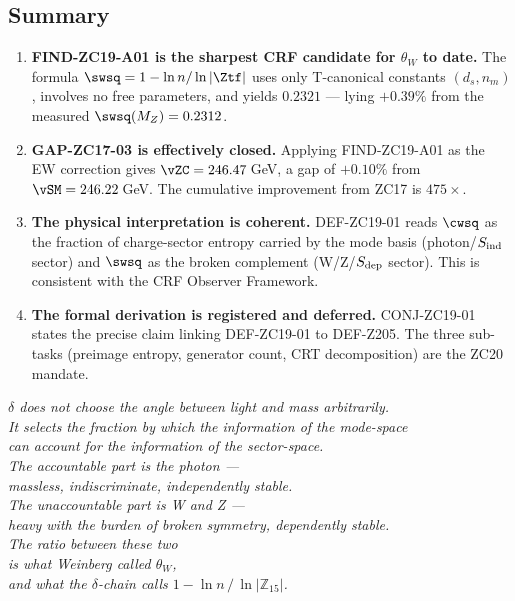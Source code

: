 \documentclass[12pt, a4paper]{article}
\begin{document}
\subsection{Summary}
\label{zc19:sec:summary}

\begin{enumerate}[leftmargin=*]

\item \textbf{FIND-ZC19-A01 is the sharpest CRF candidate
  for $\theta_W$ to date.}
  The formula $\swsq = 1 - \ln n/\ln|\Ztf|$ uses only
  T-canonical constants $(d_s, n_m)$, involves no free parameters,
  and yields $0.2321$ --- lying $+0.39\%$ from the measured
  $\swsq(M_Z) = 0.2312$.

\item \textbf{GAP-ZC17-03 is effectively closed.}
  Applying FIND-ZC19-A01 as the EW correction gives
  $\vZC = 246.47$\,GeV, a gap of $+0.10\%$ from
  $\vSM = 246.22$\,GeV.
  The cumulative improvement from ZC17 is $475\times$.

\item \textbf{The physical interpretation is coherent.}
  DEF-ZC19-01 reads $\cwsq$ as the fraction of charge-sector
  entropy carried by the mode basis (photon/$S_{\rm ind}$ sector)
  and $\swsq$ as the broken complement (W/Z/$S_{\rm dep}$ sector).
  This is consistent with the CRF Observer Framework.

\item \textbf{The formal derivation is registered and deferred.}
  CONJ-ZC19-01 states the precise claim linking DEF-ZC19-01 to
  DEF-Z205. The three sub-tasks (preimage entropy, generator
  count, CRT decomposition) are the ZC20 mandate.

\end{enumerate}

\bigskip
\begin{center}
\textit{%
  $\delta$ does not choose the angle between light and mass arbitrarily.\\[0.4em]
  It selects the fraction by which the information of the mode-space\\
  can account for the information of the sector-space.\\[0.4em]
  The accountable part is the photon ---\\
  massless, indiscriminate, independently stable.\\[0.4em]
  The unaccountable part is W and Z ---\\
  heavy with the burden of broken symmetry, dependently stable.\\[0.4em]
  The ratio between these two\\
  is what Weinberg called $\theta_W$,\\
  and what the $\delta$-chain calls $1 - \ln n\,/\,\ln|\mathbb{Z}_{15}|$.%
}
\end{center}
\end{document}
